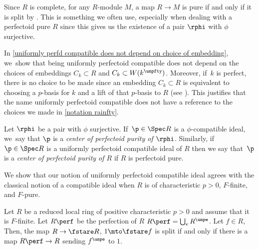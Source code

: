 \begin{remark}
Since $R$ is complete, for any $R$\nobreakdash-module $M$, a map $R\to M$ is pure if and only if it is split by \cite[Lem.\,1.2]{FedderFPureRat}. This is something we often use, especially when dealing with a perfectoid pure $R$ since this gives us the existence of a pair $\rphi$ with $\phi$ surjective.
\end{remark}
\begin{remark}
In \autoref{uniformly perfd compatible does not depend on choice of embedding}, we~show that being uniformly perfectoid compatible does not depend on the choices of embeddings $C_k\subset R$ and $C_k\subset W(k^\unpfty)$. Moreover, if~$k$ is perfect, there is no choice to be made since an embedding $C_k\subset R$ is equivalent to choosing a $p$-basis for $k$ and a lift of that $p$-basis to $R$ (see \cite[Th.\,23]{HochsterStructureCompleteLocalRings}).
This justifies that the name uniformly perfectoid compatible does not have a reference to the choices we made in \autoref{notation rainfty}.
\end{remark}

\begin{definition}
Let $\rphi$ be a pair with $\phi$ surjective. If~$\p\in \Spec R$ is a $\phi$\nobreakdash-compatible ideal, we~say that $\p$ is a \emph{center of perfectoid purity of $\rphi$}.
Similarly, if~$\p\in \Spec R$ is a uniformly perfectoid compatible ideal of $R$ then we say that~$\p$ is a \emph{center of perfectoid purity of $R$} if $R$ is perfectoid pure.
\end{definition}

We show that our notion of uniformly perfectoid compatible ideal agrees with the classical notion of a compatible ideal when $R$ is of characteristic $p>0$, $F$-finite, and $F$-pure.
\begin{lemma}\label{lemma splitting from perfection}
Let $R$ be a reduced local ring of positive characteristic $p>0$ and assume that it is $F$-finite. Let $R\perf$ be the perfection of $R$ \ie $R\perf=\bigcup_e R^\unpe$. Let $f\in R$,
Then, the map $R\to\fstare R$, $1\mto \fstare f$
is split if and only if there is a map $R\perf\to R$ sending $f^\unpe$ to $1$.
\end{lemma}

